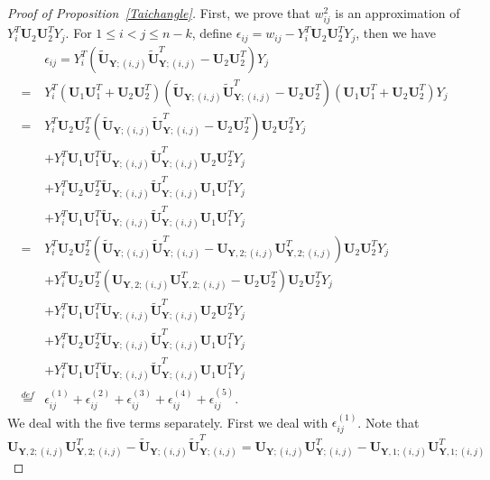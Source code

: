 \documentclass[12pt]{article} %
\newcommand{\bY}{\mathbf{Y}}
\newcommand{\bU}{\mathbf{U}}
\theoremstyle{definition}
\begin{document}
\begin{appendices}
\begin{proof}[Proof of Proposition~\ref{Taichangle}]
        First, we prove that $w_{ij}^2$ is an approximation of $Y_i^T \bU_2 \bU_2^T Y_j$.
        For $1\leq i<j\leq n-k$, define $\epsilon_{ij}= w_{ij}-Y_i^T \bU_{2} \bU_{2}^T Y_j$, then we have
        \begin{equation}\label{emLong}
    \begin{aligned}
        &\epsilon_{ij}
        =Y_i^T (\tilde{\bU}_{\bY;(i,j)} \tilde{\bU}_{\bY;(i,j)}^T-\bU_2 \bU_2^T) Y_j\\
        =&Y_i^T(\bU_1 \bU_1^T+\bU_2 \bU_2^T) (\tilde{\bU}_{\bY;(i,j)} \tilde{\bU}_{\bY;(i,j)}^T-\bU_2 \bU_2^T)(\bU_1 \bU_1^T+\bU_2 \bU_2^T) Y_j\\
        =&Y_i^T \bU_2 \bU_2^T (\tilde{\bU}_{\bY;(i,j)} \tilde{\bU}_{\bY;(i,j)}^T-\bU_2\bU_2^T) \bU_2 \bU_2^T Y_j\\
        &+Y_i^T \bU_1 \bU_1^T \tilde{\bU}_{\bY;(i,j)} \tilde{\bU}_{\bY;(i,j)}^T \bU_2 \bU_2^T Y_j\\
        &+Y_i^T \bU_2 \bU_2^T \tilde{\bU}_{\bY;(i,j)} \tilde{\bU}_{\bY;(i,j)}^T \bU_1 \bU_1^T Y_j\\
        &+Y_i^T \bU_1 \bU_1^T \tilde{\bU}_{\bY;(i,j)} \tilde{\bU}_{\bY;(i,j)}^T \bU_1 \bU_1^T Y_j\\
        =&
            Y_i^T\bU_2 \bU_2^T ( \tilde{\bU}_{\bY;(i,j)} \tilde{\bU}_{\bY;(i,j)}^T-\bU_{\bY,2;(i,j)} \bU_{\bY,2;(i,j)}^T)\bU_2 \bU_2^T Y_j\\
            &+
            Y_i^T \bU_2 \bU_2^T(\bU_{\bY,2;(i,j)} \bU_{\bY,2;(i,j)}^T-\bU_2 \bU_2^T)\bU_2 \bU_2^T Y_j\\
        &+Y_i^T \bU_1 \bU_1^T \tilde{\bU}_{\bY;(i,j)} \tilde{\bU}_{\bY;(i,j)}^T \bU_2 \bU_2^T Y_j\\
        &+Y_i^T \bU_2 \bU_2^T \tilde{\bU}_{\bY;(i,j)} \tilde{\bU}_{\bY;(i,j)}^T \bU_1 \bU_1^T Y_j\\
        &+Y_i^T \bU_1 \bU_1^T \tilde{\bU}_{\bY;(i,j)} \tilde{\bU}_{\bY;(i,j)}^T \bU_1 \bU_1^T Y_j\\
        \overset{def}{=} &
        \epsilon_{ij}^{(1)}+
        \epsilon_{ij}^{(2)}+
        \epsilon_{ij}^{(3)}+
        \epsilon_{ij}^{(4)}+
        \epsilon_{ij}^{(5)}.
    \end{aligned}
    \end{equation}
        We deal with the five terms separately.
        First we deal with $\epsilon_{ij}^{(1)}$.
        Note that
        $$
\bU_{\bY,2;(i,j)} \bU_{\bY,2;(i,j)}^T
-
        \tilde{\bU}_{\bY;(i,j)} \tilde{\bU}_{\bY;(i,j)}^T
        =
\bU_{\bY;(i,j)} \bU_{\bY;(i,j)}^T-
        \bU_{\bY,1;(i,j)} \bU_{\bY,1;(i,j)}^T
$$
\end{proof}
\end{appendices}
\end{document}
